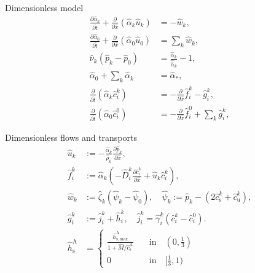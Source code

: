 \documentclass{beamer}
\begin{document}
\begin{frame}{Dimensionless model}
    \begin{align}
        \frac{\partial \hat{\alpha}_k}{\partial \hat{t}}  + \frac{\partial}{\partial \hat{x}}\left( \hat{\alpha}_k \hat{u}_k \right) &= - \hat{w}_k,\\ \label{eq:nd_1steq}
        \frac{\partial\hat{\alpha}_0}{\partial \hat{t}}+\frac{\partial}{\partial \hat{x}}\left( \hat{\alpha}_0 \hat{u}_0 \right) &=\sum_k \hat{w}_k,\\
        \hat{\nu}_k\left( \hat{p}_k - \hat{p}_0 \right) &= \frac{\hat{\alpha}_k}{\hat{\bar{\alpha}}_k}-1,\\
        \hat{\alpha}_0 + \sum_{k} \hat{\alpha}_k &= \hat{\alpha}_*,\\
        \frac{\partial}{\partial \hat{t}}\left( \hat{\alpha}_k \hat{c}_i^k \right)&=-\frac{\partial}{\partial \hat{x}} \hat{f}_i^k - \hat{g}_i^k,\\
        \frac{\partial}{\partial \hat{t}}\left( \hat{\alpha}_0 \hat{c}_i^0 \right)&=-\frac{\partial}{\partial \hat{x}} \hat{f}_i^0 + \sum_k \hat{g}_i^k,
    \end{align}
\end{frame}

\begin{frame}{Dimensionless flows and transports}
    \begin{align}
        \hat{u}_{k} &:= -\frac{\hat{\alpha}_{k}}{\hat{\rho}_{k}}\frac{\partial \hat{p}_{k}}{\partial \hat{x}},\\
        \hat{f}_i^{k} &:= \hat{\alpha}_{k}\left( -\hat{D}_i^{k} \frac{\partial \hat{c}_i^{k}}{\partial \hat{x}} + \hat{u}_{k}\hat{c}_i^{k} \right),\\
        \hat{w}_k&:= \hat{\zeta}_k\left( \hat{\psi}_k-\hat{\psi}_0 \right),\quad\hat{\psi}_{k} := \hat{p}_{k} - \left(  2\hat{c}_\mathrm{s}^{k}+\hat{c}_\mathrm{u}^{k} \right),\\
        \hat{g}_i^k &:= \hat{j}_i^k+\hat{h}_i^k,\quad \hat{j}_i^k =\hat{\gamma}_i^k(\hat{c}_i^k-\hat{c}_i^0). \label{eq:nd_lasteq}\\
        \hat{h}_\mathrm{s}^\mathrm{A} &= \begin{cases}
            \frac{\hat{h}_\mathrm{s,max}^\mathrm{A}}{1+\hat{M}/\hat{c}_\mathrm{s}^\mathrm{A}}\quad &\text{in}\quad (0,\frac{1}{3})\\
            0\quad &\text{in}\quad [\frac{1}{3},1)
        \end{cases}
    \end{align}
\end{frame}
\end{document}
